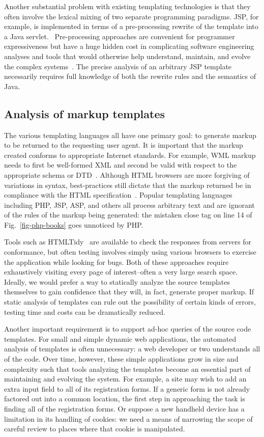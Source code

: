 \documentclass{www2003-submission}
\newcommand{\figref}[1]{Fig.~\ref{fig-#1}}
\begin{document}
Another substantial problem with existing templating technologies is
that they often involve the lexical mixing of two separate programming
paradigms.  JSP, for example, is implemented in terms of a
pre-processing rewrite of the template into a Java servlet.~\cite{JavaServlet}
Pre-processing approaches are convenient for programmer expressiveness
but have a huge hidden cost in complicating software engineering
analyses and tools that would otherwise help understand, maintain, and
evolve the complex systems~\cite{Badros00-spe,ErnstBadrosNotkin02}\cite[p.~424]{Stroustrup94}.
The precise analysis of an arbitrary JSP template necessarily requires
full knowledge of both the rewrite rules and the semantics of Java.

\subsection{Analysis of markup templates}

The various templating languages all have one primary goal: to
generate markup to be returned to the requesting user agent.  It is
important that the markup created conforms to appropriate Internet
standards.  For example, WML markup needs to first be well-formed XML
and second be valid with respect to the appropriate
schema or DTD~\cite{WML}.  Although HTML browsers are more forgiving of
variations in syntax, best-practices still dictate that the markup returned
be in compliance with the HTML specification~\cite{HTML}.  
Popular templating languages including PHP, JSP, ASP, and others
all process arbitrary text and are ignorant of the rules of the markup
being generated: the mistaken close tag on line 14 of \figref{php-books}
goes unnoticed by PHP.

Tools such as HTMLTidy~\cite{HTMLTidy} are available to check the
responses from servers for conformance, but often testing involves
simply using various browsers to exercise the application while
looking for bugs.  Both of these approaches require exhaustively
visiting every page of interest--often a very large search space.
Ideally, we would prefer a way to statically analyze the source templates
themselves to gain confidence that they will, in fact, generate proper
markup.  If static analysis of templates can rule out the possibility
of certain kinds of errors, testing time and costs can be dramatically
reduced.

Another important requirement is to support ad-hoc queries of
the source code templates. For small and simple dynamic web applications,
the automated analysis of templates is often unnecessary: a web
developer or two understands all of the code.  Over time, however,
these simple applications grow in size and complexity such that
tools analyzing the templates become an essential part of maintaining
and evolving the system. For example, a site may wish to add an extra
input field to all of its registration forms.  If a generic form is
not already factored out into a common location, the first step in
approaching the task is finding all of the registration forms.  Or
suppose a new handheld device has a limitation in its handling of cookies:
we need a means of narrowing the scope of careful review to places
where that cookie is manipulated.
\end{document}
